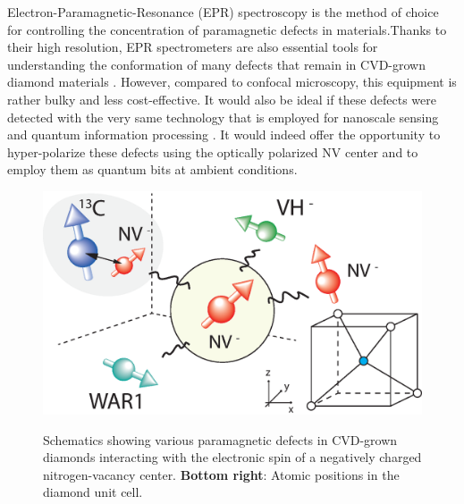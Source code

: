 \documentclass[9pt,twocolumn,twoside]{revtex4-1}
\begin{document}
Electron-Paramagnetic-Resonance (EPR) spectroscopy is the method of choice for controlling the concentration of paramagnetic defects in materials.Thanks to their high resolution, EPR spectrometers are also essential tools for understanding the conformation of many defects that remain in
CVD-grown diamond materials \cite{newton_epr_2007, glover_hydrogen_2004, glover_hydrogen_2003}. However, compared to confocal microscopy, this equipment is rather bulky and less cost-effective. 
It would also be ideal if these defects were detected with the very same technology that is employed for nanoscale sensing \cite{Rondin_2014} and quantum information processing \cite{Yao}. 
It would indeed offer the opportunity to hyper-polarize these defects using the optically polarized NV center and to employ them as quantum bits at ambient conditions.

 \begin{figure}[htbp]
\centering
{\includegraphics[width=\linewidth]{Fig1}}
\caption{Schematics showing various paramagnetic defects in CVD-grown diamonds interacting with the electronic spin of a negatively charged nitrogen-vacancy center. \textbf{Bottom right}: Atomic positions in the diamond unit cell.}
\label{fig1}
\end{figure}


\end{document}
